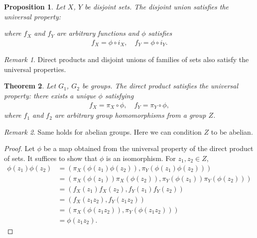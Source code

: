 \documentclass[12pt]{report}
\theoremstyle{plain}
\newtheorem{theorem}{Theorem}[section]
\newtheorem{proposition}[theorem]{Proposition}
\theoremstyle{remark}
\newtheorem*{remark}{Remark}
\theoremstyle{definition}
\begin{document}
\begin{proposition}
    Let $X$, $Y$ be disjoint sets. The disjoint union satisfies the universal property:
    \begin{figure}[H]
    \centering
    \end{figure}
    \noindent
    where $f_X$ and $f_Y$ are arbitrary functions and $\phi$ satisfies
    \begin{align*}
        f_X=\phi\circ i_X,\quad f_Y=\phi\circ i_Y.
    \end{align*}
\end{proposition}
\begin{remark}
    Direct products and disjoint unions of families of sets also satisfy the universal properties.
\end{remark}

\begin{theorem}
    Let $G_1$, $G_2$ be groups. The direct product satisfies the universal property: there exists a unique $\phi$ satisfying
    \begin{align*}
        f_X=\pi_X\circ \phi,\quad f_Y=\pi_Y\circ \phi,
    \end{align*}
    where $f_1$ and $f_2$ are arbitrary group homomorphisms from a group $Z$.
    \begin{figure}[H]
    \centering
    \end{figure}
\end{theorem}
\begin{remark}
    Same holds for abelian groups. Here we can condition $Z$ to be abelian.
\end{remark}
\begin{proof}
    Let $\phi$ be a map obtained from the universal property of the direct product of sets. It suffices to show that $\phi$ is an isomorphism. For $z_1,z_2\in Z$,
    \begin{align*}
        \phi(z_1)\phi(z_2) &= (\pi_X(\phi(z_1)\phi(z_2)),\pi_Y(\phi(z_1)\phi(z_2))) \\
        &= (\pi_X(\phi(z_1))\pi_X(\phi(z_2)),\pi_Y(\phi(z_1))\pi_Y(\phi(z_2))) \\
        &= (f_X(z_1)f_X(z_2),f_Y(z_1)f_Y(z_2)) \\
        &= (f_X(z_1z_2),f_Y(z_1z_2)) \\
        &= (\pi_X(\phi(z_1z_2)),\pi_Y(\phi(z_1z_2))) \\
        &= \phi(z_1z_2).
    \end{align*}
\end{proof}
\end{document}
